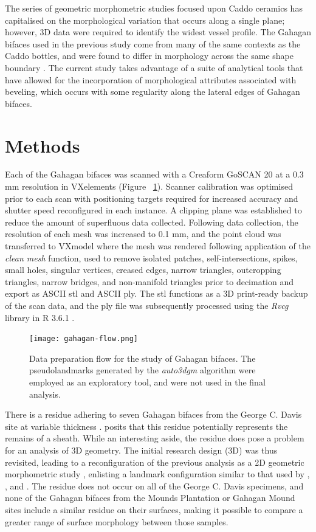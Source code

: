 \documentclass[review]{elsarticle}
\begin{document}
The series of geometric morphometric studies focused upon Caddo ceramics has capitalised on the morphological variation that occurs along a single plane; however, 3D data were required to identify the widest vessel profile. The Gahagan bifaces used in the previous study come from many of the same contexts as the Caddo bottles, and were found to differ in morphology across the same shape boundary \citep[Figure 15.1]{RN11783,RN20852}. The current study takes advantage of a suite of analytical tools that have allowed for the incorporation of morphological attributes associated with beveling, which occurs with some regularity along the lateral edges of Gahagan bifaces.

\section*{Methods}

Each of the Gahagan bifaces was scanned with a Creaform GoSCAN 20 at a 0.3 mm resolution in VXelements (Figure ~\ref{fig:figflow}). Scanner calibration was optimised prior to each scan with positioning targets required for increased accuracy and shutter speed reconfigured in each instance. A clipping plane was established to reduce the amount of superfluous data collected. Following data collection, the resolution of each mesh was increased to 0.1 mm, and the point cloud was transferred to VXmodel where the mesh was rendered following application of the \textit{clean mesh} function, used to remove isolated patches, self-intersections, spikes, small holes, singular vertices, creased edges, narrow triangles, outcropping triangles, narrow bridges, and non-manifold triangles prior to decimation and export as ASCII stl and ASCII ply. The stl functions as a 3D print-ready backup of the scan data, and the ply file was subsequently processed using the \textit{Rvcg} library in R 3.6.1 \citep{RN20849,R,RN20850}.

\begin{figure}[ht!]\centering
\texttt{[image: gahagan-flow.png]}
\caption{Data preparation flow for the study of Gahagan bifaces. The pseudolandmarks generated by the \textit{auto3dgm} algorithm were employed as an exploratory tool, and were not used in the final analysis.}
\label{fig:figflow}
\end{figure}

There is a residue adhering to seven Gahagan bifaces from the George C. Davis site at variable thickness \citep[Figure 2]{RN11783}. \citet[228]{RN3684} posits that this residue potentially represents the remains of a sheath. While an interesting aside, the residue does pose a problem for an analysis of 3D geometry. The initial research design (3D) was thus revisited, leading to a reconfiguration of the previous analysis as a 2D geometric morphometric study \citep{RN11783}, enlisting a landmark configuration similar to that used by \citet[Figure 2]{RN1754}, \citet[Figure 2]{RN1736}, and \citet[Figure 1]{RN11731}. The residue does not occur on all of the George C. Davis specimens, and none of the Gahagan bifaces from the Mounds Plantation or Gahagan Mound sites include a similar residue on their surfaces, making it possible to compare a greater range of surface morphology between those samples. 
\end{document}

